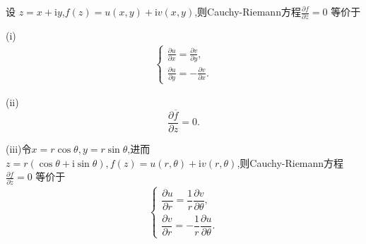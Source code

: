 \documentclass[../../main.tex]{subfiles}
\begin{document}
\begin{proposition}\label{proposition:Cauchy-Riemann方程的等价定义}
设 $z=x+\mathrm{i}y$,$f(z) = u(x,y) + \mathrm{i}v(x,y)$,则Cauchy-Riemann方程$\frac{\partial f}{\partial \overline{z}} = 0$ 等价于

(i)\begin{align}\label{equation:--2.5}
\begin{cases}
\frac{\partial u}{\partial x}=\frac{\partial v}{\partial y},\\
\frac{\partial u}{\partial y}=-\frac{\partial v}{\partial x}.
\end{cases}
\end{align}

(ii)$$\frac{\partial \overline{f}}{\partial z}=0.$$

(iii)令$x=r\cos \theta ,y=r\sin \theta $,进而$z=r(\cos\theta+\mathrm{i}\sin\theta),f(z) = u(r,\theta) + \mathrm{i}v(r,\theta)$,则Cauchy-Riemann方程$\frac{\partial f}{\partial \overline{z}} = 0$ 等价于
\begin{align*}
\begin{cases}
\dfrac{\partial u}{\partial r} = \dfrac{1}{r} \dfrac{\partial v}{\partial \theta}, \\
\dfrac{\partial v}{\partial r} = -\dfrac{1}{r} \dfrac{\partial u}{\partial \theta}.
\end{cases}
\end{align*}
\end{proposition}
\end{document}

